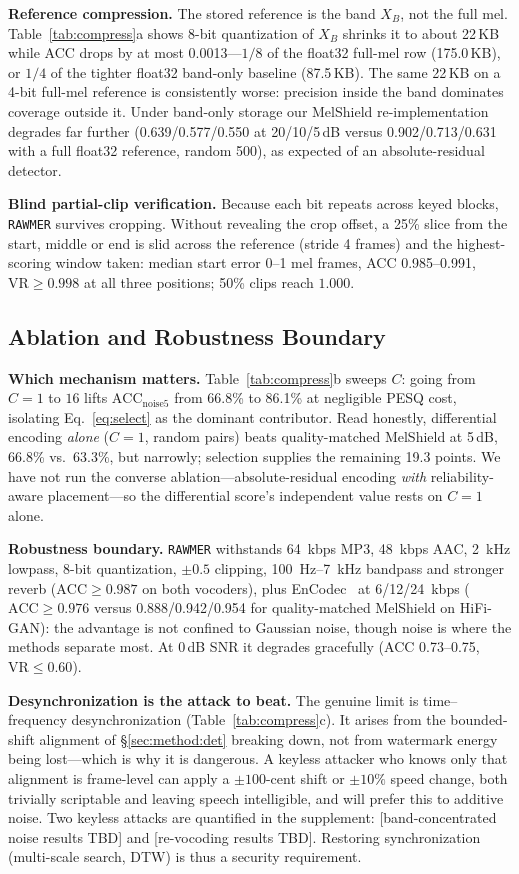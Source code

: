 \textbf{Reference compression.} The stored reference is the band $X_B$, not the full
mel. Table~\ref{tab:compress}a shows 8-bit quantization of $X_B$ shrinks it to about
22\,KB while ACC drops by at most 0.0013---$1/8$ of the float32 full-mel row
(175.0\,KB), or $1/4$ of the tighter float32 band-only baseline (87.5\,KB). The same
22\,KB on a 4-bit full-mel reference is consistently worse: precision inside the band
dominates coverage outside it. Under band-only storage our MelShield
re-implementation degrades far further (0.639/0.577/0.550 at 20/10/5\,dB versus
0.902/0.713/0.631 with a full float32 reference, random 500), as expected of an
absolute-residual detector.

\textbf{Blind partial-clip verification.} Because each bit repeats across keyed
blocks, \texttt{RAWMER} survives cropping. Without revealing the crop offset, a 25\%
slice from the start, middle or end is slid across the reference (stride 4 frames)
and the highest-scoring window taken: median start error 0--1 mel frames, ACC
0.985--0.991, $\text{VR} \geq 0.998$ at all three positions; 50\% clips reach
$1.000$.

\subsection{Ablation and Robustness Boundary}

\textbf{Which mechanism matters.} Table~\ref{tab:compress}b sweeps $C$: going from
$C = 1$ to $16$ lifts $\text{ACC}_{\text{noise5}}$ from 66.8\% to 86.1\% at negligible
PESQ cost, isolating Eq.~\eqref{eq:select} as the dominant contributor. Read honestly,
differential encoding \emph{alone} ($C = 1$, random pairs) beats quality-matched
MelShield at 5\,dB, 66.8\% vs.\ 63.3\%, but narrowly; selection supplies the remaining
19.3 points. We have not run the converse ablation---absolute-residual encoding
\emph{with} reliability-aware placement---so the differential score's independent
value rests on $C = 1$ alone.

\textbf{Robustness boundary.} \texttt{RAWMER} withstands 64~kbps MP3, 48~kbps AAC,
2~kHz lowpass, 8-bit quantization, $\pm 0.5$ clipping, 100~Hz--7~kHz bandpass and
stronger reverb ($\text{ACC} \geq 0.987$ on both vocoders), plus
EnCodec~\cite{defossez2022} at 6/12/24~kbps ($\text{ACC} \geq 0.976$ versus
0.888/0.942/0.954 for quality-matched MelShield on HiFi-GAN): the advantage is not
confined to Gaussian noise, though noise is where the methods separate most. At 0\,dB
SNR it degrades gracefully (ACC 0.73--0.75, $\text{VR} \leq 0.60$).

\textbf{Desynchronization is the attack to beat.} The genuine limit is
time--frequency desynchronization (Table~\ref{tab:compress}c). It arises from the
bounded-shift alignment of \S\ref{sec:method:det} breaking down, not from watermark
energy being lost---which is why it is dangerous. A keyless attacker who knows only that
alignment is frame-level can apply a $\pm 100$-cent shift or $\pm 10\%$ speed change,
both trivially scriptable and leaving speech intelligible, and will prefer this to
additive noise. Two keyless attacks are quantified in the supplement: [band-concentrated noise results TBD] and [re-vocoding results TBD]. Restoring
synchronization (multi-scale search, DTW) is thus a security requirement.
